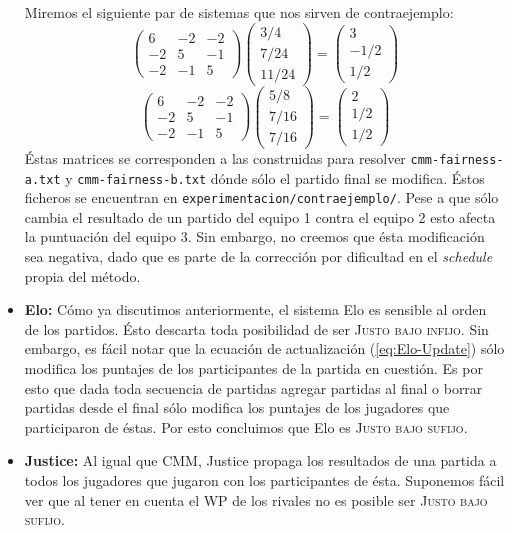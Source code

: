 \documentclass[a4paper]{article}
\begin{document}
\begin{itemize}
    Miremos el siguiente par de sistemas que nos sirven de contraejemplo:
    \[
        \begin{pmatrix}
             6 & -2 & -2 \\
            -2 &  5 & -1 \\
            -2 & -1 &  5
        \end{pmatrix}
        \begin{pmatrix}
            3 / 4 \\
            7 / 24 \\
            11 / 24
        \end{pmatrix}
        =
        \begin{pmatrix}
            3 \\
            -1 / 2 \\
            1 / 2
        \end{pmatrix}
    \]
    \[
        \begin{pmatrix}
             6 & -2 & -2 \\
            -2 &  5 & -1 \\
            -2 & -1 &  5
        \end{pmatrix}
        \begin{pmatrix}
            5 / 8 \\
            7 / 16 \\
            7 / 16
        \end{pmatrix}
        =
        \begin{pmatrix}
            2 \\
            1 / 2 \\
            1 / 2
        \end{pmatrix}
    \]
    Éstas matrices se corresponden a las construidas para resolver \texttt{cmm-fairness-a.txt} y \texttt{cmm-fairness-b.txt} dónde sólo el partido final se modifica. Éstos ficheros se encuentran en \texttt{experimentacion/contraejemplo/}. Pese a que sólo cambia el resultado de un partido del equipo 1 contra el equipo 2 esto afecta la puntuación del equipo 3. Sin embargo, no creemos que ésta modificación sea negativa, dado que es parte de la corrección por dificultad en el \textit{schedule} propia del método.

    \item \textbf{Elo:} Cómo ya discutimos anteriormente, el sistema Elo es sensible al orden de los partidos. Ésto descarta toda posibilidad de ser \textsc{Justo bajo infijo}. Sin embargo, es fácil notar que la ecuación de actualización (\ref{eq:Elo-Update}) sólo modifica los puntajes de los participantes de la partida en cuestión. Es por esto que dada toda secuencia de partidas agregar partidas al final o borrar partidas desde el final sólo modifica los puntajes de los jugadores que participaron de éstas. Por esto concluimos que Elo es \textsc{Justo bajo sufijo}.

    \item \textbf{Justice:} Al igual que CMM, Justice propaga los resultados de una partida a todos los jugadores que jugaron con los participantes de ésta. Suponemos fácil ver que al tener en cuenta el WP de los rivales no es posible ser \textsc{Justo bajo sufijo}.
\end{itemize}
\end{document}
